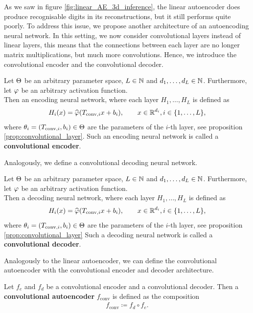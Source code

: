 As we saw in figure \ref{fig:linear_AE_3d_inference}, the linear autoencoder does produce recognisable digits in its reconstructions, but it still performs quite poorly. To address this issue, we propose another architecture of an autoencoding neural network. In this setting, we now consider convolutional layers instead of linear layers, this means that the connections between each layer are no longer matrix multiplications, but much more convolutions. Hence, we introduce the convolutional encoder and the convolutional decoder.


\begin{definition}\label{def_convolutional_encoder}
Let $\operatorname{\Theta}$ be an arbitrary parameter space, $L\in \operatorname{\mathbb{N}}$ and $d_1,\ldots,d_L \in \operatorname{\mathbb{N}}$. Furthermore, let $\operatorname{\varphi}$ be an arbitrary activation function.\\
Then an encoding neural network, where each layer $H_1,\ldots, H_L$ is defined as
\begin{align*}
H_i(x) = \widehat{\operatorname{\varphi}}(T_{\text{conv}, i}x + b_i), \qquad x \in \operatorname{\mathbb{R}}^{d_i}, i \in \{1,\ldots, L\},
\end{align*}
where $\theta_i = (T_{\text{conv}, i}, b_i)\in\operatorname{\Theta}$ are the parameters of the $i$-th layer, see proposition \ref{prop:convolutional_layer}. Such an encoding neural network is called a \textbf{convolutional encoder}.
\end{definition}

Analogously, we define a convolutional decoding neural network.

\begin{definition}\label{def_convolutional_decoder}
Let $\operatorname{\Theta}$ be an arbitrary parameter space, $L\in \operatorname{\mathbb{N}}$ and $d_1,\ldots,d_L \in \operatorname{\mathbb{N}}$. Furthermore, let $\operatorname{\varphi}$ be an arbitrary activation function.\\
Then a decoding neural network, where each layer $H_1,\ldots, H_L$ is defined as
\begin{align*}
H_i(x) = \widehat{\operatorname{\varphi}}(T_{\text{conv}, i}x + b_i), \qquad x \in \operatorname{\mathbb{R}}^{d_i}, i \in \{1,\ldots, L\},
\end{align*}
where $\theta_i = (T_{\text{conv}, i}, b_i)\in\operatorname{\Theta}$ are the parameters of the $i$-th layer, see proposition \ref{prop:convolutional_layer} Such a decoding neural network is called a \textbf{convolutional decoder}.
\end{definition}


Analogously to the linear autoencoder, we can define the convolutional autoencoder with the convolutional encoder and decoder architecture.

\begin{definition}
Let $f_e$ and $f_d$ be a convolutional encoder and a convolutional decoder. Then a \textbf{convolutional autoencoder} $f_{\text{conv}}$ is defined as the composition
\begin{align*}
f_{\text{conv}} \coloneqq f_d \circ f_e.
\end{align*}
\end{definition}

